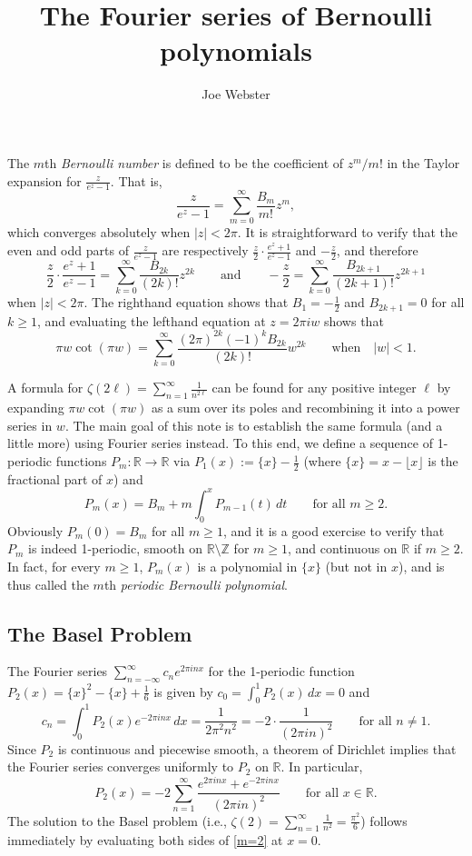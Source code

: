 \documentclass{article}
\title{The Fourier series of Bernoulli polynomials}
\author{Joe Webster}
\newcommand\R{\mathbb{R}}
\newcommand\Z{\mathbb{Z}}
\theoremstyle{definition}
\numberwithin{equation}{subsection}
\begin{document}
\maketitle
The $m$th \emph{Bernoulli number} is defined to be the coefficient of $z^m/m!$ in the Taylor expansion for $\frac{z}{e^z-1}$. That is, $$\frac{z}{e^z-1}=\sum_{m=0}^\infty\frac{B_m}{m!}z^m,$$ which converges absolutely when $|z|<2\pi$. It is straightforward to verify that the even and odd parts of $\frac{z}{e^z-1}$ are respectively $\frac{z}{2}\cdot\frac{e^z+1}{e^z-1}$ and $-\frac{z}{2}$, and therefore $$\frac{z}{2}\cdot\frac{e^z+1}{e^z-1}=\sum_{k=0}^\infty\frac{B_{2k}}{(2k)!}z^{2k}\qquad\text{and}\qquad-\frac{z}{2}=\sum_{k=0}^\infty\frac{B_{2k+1}}{(2k+1)!}z^{2k+1}$$ when $|z|<2\pi$. The righthand equation shows that $B_1=-\frac{1}{2}$ and $B_{2k+1}=0$ for all $k\geq 1$, and evaluating the lefthand equation at $z=2\pi iw$ shows that
\begin{equation}\label{cot}
\pi w\cot(\pi w)=\sum_{k=0}^\infty\frac{(2\pi)^{2k}(-1)^kB_{2k}}{(2k)!}w^{2k}\qquad\text{when}\quad |w|<1.
\end{equation}

A formula for $\zeta(2\ell)=\sum_{n=1}^\infty\frac{1}{n^{2\ell}}$ can be found for any positive integer $\ell$ by expanding $\pi w\cot(\pi w)$ as a sum over its poles and recombining it into a power series in $w$. The main goal of this note is to establish the same formula (and a little more) using Fourier series instead. To this end, we define a sequence of 1-periodic functions $P_m:\R\to\R$ via $P_1(x):=\{x\}-\frac{1}{2}$ (where $\{x\}=x-\lfloor x\rfloor$ is the fractional part of $x$) and $$P_m(x)=B_m+m\int_0^xP_{m-1}(t)\,dt\qquad\text{for all }m\geq 2.$$ Obviously $P_m(0)=B_m$ for all $m\geq 1$, and it is a good exercise to verify that $P_m$ is indeed 1-periodic, smooth on $\R\setminus\Z$ for $m\geq 1$, and continuous on $\R$ if $m\geq 2$. In fact, for every $m\geq 1$, $P_m(x)$ is a polynomial in $\{x\}$ (but not in $x$), and is thus called the $m$th \emph{periodic Bernoulli polynomial}. 

\subsection*{The Basel Problem}
The Fourier series $\sum_{n=-\infty}^\infty c_ne^{2\pi inx}$ for the 1-periodic function $P_2(x)=\{x\}^2-\{x\}+\frac{1}{6}$ is given by $c_0=\int_0^1P_2(x)\,dx=0$ and $$c_n=\int_0^1P_2(x)e^{-2\pi inx}\,dx=\frac{1}{2\pi^2n^2}=-2\cdot\frac{1}{(2\pi in)^2}\qquad\text{for all $n\neq1$}.$$
Since $P_2$ is continuous and piecewise smooth, a theorem of Dirichlet implies that the Fourier series converges uniformly to $P_2$ on $\R$. In particular,
\begin{equation}\label{m=2}
P_2(x)=-2\sum_{n=1}^\infty\frac{e^{2\pi inx}+e^{-2\pi inx}}{(2\pi in)^2}\qquad\text{for all $x\in\R$}.
\end{equation}
The solution to the Basel problem (i.e., $\zeta(2)=\sum_{n=1}^\infty\frac{1}{n^2}=\frac{\pi^2}{6}$) follows immediately by evaluating both sides of \eqref{m=2} at $x=0$.
\end{document}
